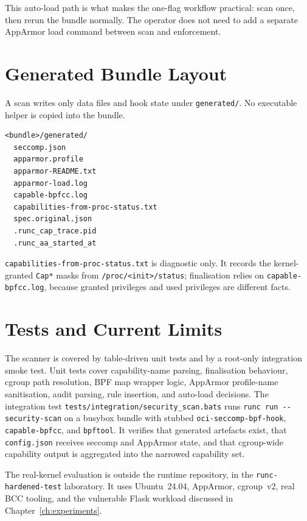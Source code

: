 This auto-load path is what makes the one-flag workflow practical: scan once, then rerun the bundle normally. The operator does not need to add a separate AppArmor load command between scan and enforcement.

\section{Generated Bundle Layout}\label{sec:impl-bundle}

A scan writes only data files and hook state under \texttt{generated/}. No executable helper is copied into the bundle.

\begin{verbatim}
<bundle>/generated/
  seccomp.json
  apparmor.profile
  apparmor-README.txt
  apparmor-load.log
  capable-bpfcc.log
  capabilities-from-proc-status.txt
  spec.original.json
  .runc_cap_trace.pid
  .runc_aa_started_at
\end{verbatim}

\texttt{capabilities-from-proc-status.txt} is diagnostic only. It records the kernel-granted \texttt{Cap*} masks from \texttt{/proc/<init>/status}; finalisation relies on \texttt{capable-bpfcc.log}, because granted privileges and used privileges are different facts.

\section{Tests and Current Limits}\label{sec:impl-tests}

The scanner is covered by table-driven unit tests and by a root-only integration smoke test. Unit tests cover capability-name parsing, finalisation behaviour, cgroup path resolution, BPF map wrapper logic, AppArmor profile-name sanitisation, audit parsing, rule insertion, and auto-load decisions. The integration test \texttt{tests/integration/security\_scan.bats} runs \texttt{runc run -{}-security-scan} on a busybox bundle with stubbed \texttt{oci-seccomp-bpf-hook}, \texttt{capable-bpfcc}, and \texttt{bpftool}. It verifies that generated artefacts exist, that \texttt{config.json} receives seccomp and AppArmor state, and that cgroup-wide capability output is aggregated into the narrowed capability set.

The real-kernel evaluation is outside the runtime repository, in the \texttt{runc-hardened-test} laboratory. It uses Ubuntu~24.04, AppArmor, cgroup~v2, real BCC tooling, and the vulnerable Flask workload discussed in Chapter~\ref{ch:experiments}.

